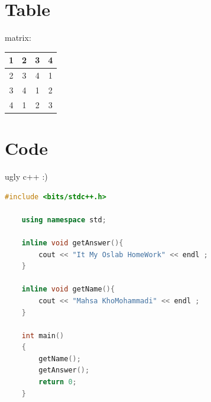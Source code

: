 \documentclass[12pt]{article}
\begin{document}
\section{Table}
\begin{table}[h]
    \begin{center}
         matrix: \\
        \begin{tabular}{||c|c|c|c||}
            \hline
            1 & 2 & 3 & 4\\
            \hline
            2 & 3 & 4 & 1\\
            \hline
            3 & 4 & 1 & 2\\
            \hline
             4 & 1 & 2 & 3\\
            \hline
        \end{tabular}
    \end{center}
\end{table}

\newpage
\section{Code}
ugly c++ :)\\
\begin{lstlisting}[language=C++]
    #include <bits/stdc++.h>
    
    using namespace std;
    
    inline void getAnswer(){
        cout << "It My Oslab HomeWork" << endl ;
    }
    
    inline void getName(){
        cout << "Mahsa KhoMohammadi" << endl ;
    }
    
    int main()
    {    
        getName();
        getAnswer();
        return 0;
    }
\end{lstlisting}
\end{document}
